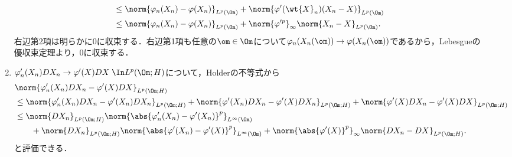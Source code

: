 \documentclass[uplatex,dvipdfmx]{jsreport}
\begin{document}
\begin{Proof}
\begin{description}
\begin{enumerate}
\begin{align*}
                &\le\norm{\varphi_n(X_n)-\varphi(X_n)}_{L^p(\Om)}+\norm{\varphi'(\wt{X}_n)(X_n-X)}_{L^p(\Om)}\\
                &\le\norm{\varphi_n(X_n)-\varphi(X_n)}_{L^p(\Om)}+\norm{\varphi'^p}_\infty\norm{X_n-X}_{L^p(\Om)}.
            \end{align*}
            右辺第2項は明らかに$0$に収束する．右辺第1項も任意の$\om\in\Om$について$\varphi_n(X_n(\om))\to\varphi(X_n(\om))$であるから，Lebesgueの優収束定理より，$0$に収束する．
            \item $\varphi_n'(X_n)DX_n\to\varphi'(X)DX\;\In L^p(\Om;H)$について，Holderの不等式から
            \begin{align*}
                &\norm{\varphi_n'(X_n)DX_n-\varphi'(X)DX}_{L^p(\Om;H)}\\
                &\le\norm{\varphi_n'(X_n)DX_n-\varphi'(X_n)DX_n}_{L^p(\Om;H)}+\norm{\varphi'(X_n)DX_n-\varphi'(X)DX_n}_{L^p(\Om;H)}+\norm{\varphi'(X)DX_n-\varphi'(X)DX}_{L^p(\Om;H)}\\
                &\le\norm{DX_n}_{L^p(\Om;H)}\norm{\abs{\varphi_n'(X_n)-\varphi'(X_n)}^p}_{L^\infty(\Om)}\\
                &\qquad +\norm{DX_n}_{L^p(\Om;H)}\norm{\abs{\varphi'(X_n)-\varphi'(X)}^p}_{L^\infty(\Om)}+\norm{\abs{\varphi'(X)}^p}_{\infty}\norm{DX_n-DX}_{L^p(\Om;H)}.
            \end{align*}
            と評価できる．
        \end{enumerate}
    \end{description}
\end{Proof}
\end{document}
